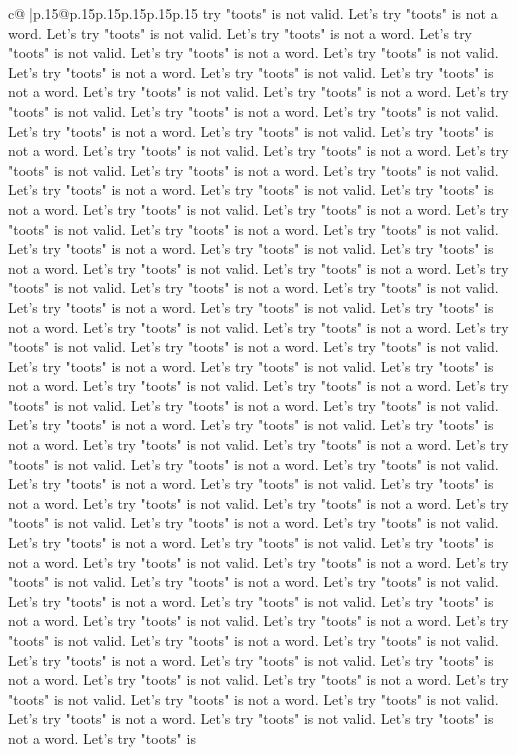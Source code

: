 \documentclass{article}
\begin{document}
{\begin{supertabular}{c@{$\;$}|p{.15\linewidth}@{}p{.15\linewidth}p{.15\linewidth}p{.15\linewidth}p{.15\linewidth}p{.15\linewidth}}
{{{try "toots" is not valid. Let's try "toots" is not a word. Let's try "toots" is not valid. Let's try "toots" is not a word. Let's try "toots" is not valid. Let's try "toots" is not a word. Let's try "toots" is not valid. Let's try "toots" is not a word. Let's try "toots" is not valid. Let's try "toots" is not a word. Let's try "toots" is not valid. Let's try "toots" is not a word. Let's try "toots" is not valid. Let's try "toots" is not a word. Let's try "toots" is not valid. Let's try "toots" is not a word. Let's try "toots" is not valid. Let's try "toots" is not a word. Let's try "toots" is not valid. Let's try "toots" is not a word. Let's try "toots" is not valid. Let's try "toots" is not a word. Let's try "toots" is not valid. Let's try "toots" is not a word. Let's try "toots" is not valid. Let's try "toots" is not a word. Let's try "toots" is not valid. Let's try "toots" is not a word. Let's try "toots" is not valid. Let's try "toots" is not a word. Let's try "toots" is not valid. Let's try "toots" is not a word. Let's try "toots" is not valid. Let's try "toots" is not a word. Let's try "toots" is not valid. Let's try "toots" is not a word. Let's try "toots" is not valid. Let's try "toots" is not a word. Let's try "toots" is not valid. Let's try "toots" is not a word. Let's try "toots" is not valid. Let's try "toots" is not a word. Let's try "toots" is not valid. Let's try "toots" is not a word. Let's try "toots" is not valid. Let's try "toots" is not a word. Let's try "toots" is not valid. Let's try "toots" is not a word. Let's try "toots" is not valid. Let's try "toots" is not a word. Let's try "toots" is not valid. Let's try "toots" is not a word. Let's try "toots" is not valid. Let's try "toots" is not a word. Let's try "toots" is not valid. Let's try "toots" is not a word. Let's try "toots" is not valid. Let's try "toots" is not a word. Let's try "toots" is not valid. Let's try "toots" is not a word. Let's try "toots" is not valid. Let's try "toots" is not a word. Let's try "toots" is not valid. Let's try "toots" is not a word. Let's try "toots" is not valid. Let's try "toots" is not a word. Let's try "toots" is not valid. Let's try "toots" is not a word. Let's try "toots" is not valid. Let's try "toots" is not a word. Let's try "toots" is not valid. Let's try "toots" is not a word. Let's try "toots" is not valid. Let's try "toots" is not a word. Let's try "toots" is not valid. Let's try "toots" is not a word. Let's try "toots" is not valid. Let's try "toots" is not a word. Let's try "toots" is not valid. Let's try "toots" is not a word. Let's try "toots" is not valid. Let's try "toots" is not a word. Let's try "toots" is not valid. Let's try "toots" is not a word. Let's try "toots" is not valid. Let's try "toots" is not a word. Let's try "toots" is not valid. Let's try "toots" is not a word. Let's try "toots" is not valid. Let's try "toots" is not a word. Let's try "toots" is not valid. Let's try "toots" is not a word. Let's try "toots" is not valid. Let's try "toots" is not a word. Let's try "toots" is not valid. Let's try "toots" is not a word. Let's try "toots" is not valid. Let's try "toots" is not a word. Let's try "toots" is }}}
\end{supertabular}}
\end{document}
